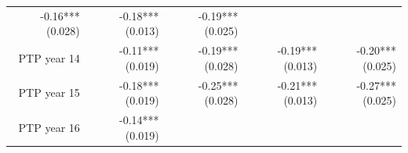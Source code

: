 \documentclass[]{article}
\begin{document}
\begin{longtable}[c]{@{}rrrrr@{}}
\begin{minipage}[t]{0.16\columnwidth}
-0.16*** (0.028)
\strut\end{minipage} &
\begin{minipage}[t]{0.18\columnwidth}\raggedleft\strut
-0.18*** (0.013)
\strut\end{minipage} &
\begin{minipage}[t]{0.15\columnwidth}\raggedleft\strut
-0.19*** (0.025)
\strut\end{minipage}\tabularnewline
\begin{minipage}[t]{0.17\columnwidth}\raggedleft\strut
PTP year 14
\strut\end{minipage} &
\begin{minipage}[t]{0.20\columnwidth}\raggedleft\strut
-0.11*** (0.019)
\strut\end{minipage} &
\begin{minipage}[t]{0.16\columnwidth}\raggedleft\strut
-0.19*** (0.028)
\strut\end{minipage} &
\begin{minipage}[t]{0.18\columnwidth}\raggedleft\strut
-0.19*** (0.013)
\strut\end{minipage} &
\begin{minipage}[t]{0.15\columnwidth}\raggedleft\strut
-0.20*** (0.025)
\strut\end{minipage}\tabularnewline
\begin{minipage}[t]{0.17\columnwidth}\raggedleft\strut
PTP year 15
\strut\end{minipage} &
\begin{minipage}[t]{0.20\columnwidth}\raggedleft\strut
-0.18*** (0.019)
\strut\end{minipage} &
\begin{minipage}[t]{0.16\columnwidth}\raggedleft\strut
-0.25*** (0.028)
\strut\end{minipage} &
\begin{minipage}[t]{0.18\columnwidth}\raggedleft\strut
-0.21*** (0.013)
\strut\end{minipage} &
\begin{minipage}[t]{0.15\columnwidth}\raggedleft\strut
-0.27*** (0.025)
\strut\end{minipage}\tabularnewline
\begin{minipage}[t]{0.17\columnwidth}\raggedleft\strut
PTP year 16
\strut\end{minipage} &
\begin{minipage}[t]{0.20\columnwidth}\raggedleft\strut
-0.14*** (0.019)
\strut\end{minipage} &
\begin{minipage}[t]{0.16\columnwidth}\raggedleft\strut

\end{minipage}
\end{longtable}
\end{document}
